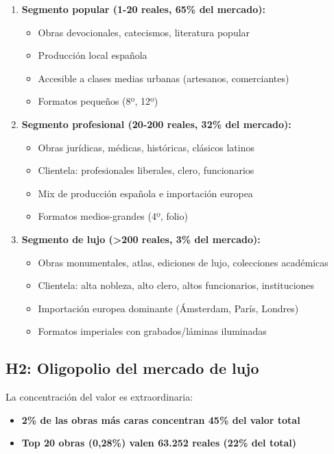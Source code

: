 \documentclass[12pt,a4paper]{article}
\begin{document}
\begin{enumerate}
    \item \textbf{Segmento popular (1-20 reales, 65\% del mercado):}
    \begin{itemize}
        \item Obras devocionales, catecismos, literatura popular
        \item Producción local española
        \item Accesible a clases medias urbanas (artesanos, comerciantes)
        \item Formatos pequeños (8º, 12º)
    \end{itemize}

    \item \textbf{Segmento profesional (20-200 reales, 32\% del mercado):}
    \begin{itemize}
        \item Obras jurídicas, médicas, históricas, clásicos latinos
        \item Clientela: profesionales liberales, clero, funcionarios
        \item Mix de producción española e importación europea
        \item Formatos medios-grandes (4º, folio)
    \end{itemize}

    \item \textbf{Segmento de lujo (>200 reales, 3\% del mercado):}
    \begin{itemize}
        \item Obras monumentales, atlas, ediciones de lujo, colecciones académicas
        \item Clientela: alta nobleza, alto clero, altos funcionarios, instituciones
        \item Importación europea dominante (Ámsterdam, París, Londres)
        \item Formatos imperiales con grabados/láminas iluminadas
    \end{itemize}
\end{enumerate}

\subsection{H2: Oligopolio del mercado de lujo}

La concentración del valor es extraordinaria:
\begin{itemize}
    \item \textbf{2\% de las obras más caras concentran 45\% del valor total}
    \item \textbf{Top 20 obras (0,28\%) valen 63.252 reales (22\% del total)}
\end{itemize}
\end{document}
